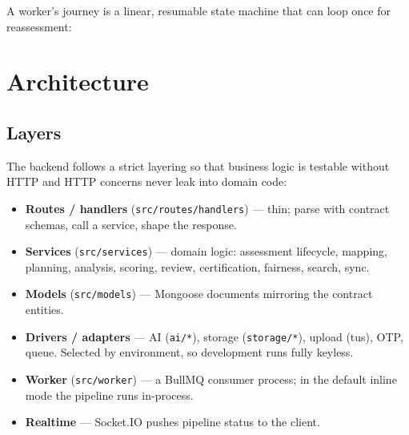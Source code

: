 \documentclass[11pt,a4paper]{article}
\newcommand{\code}[1]{\texttt{\small #1}}
\begin{document}
\noindent A worker's journey is a linear, resumable state machine that can
loop once for reassessment:

\begin{center}
\end{center}

\section{Architecture}
\subsection{Layers}
The backend follows a strict layering so that business logic is testable
without HTTP and HTTP concerns never leak into domain code:
\begin{itemize}
\item \textbf{Routes / handlers} (\code{src/routes/handlers}) --- thin; parse
      with contract schemas, call a service, shape the response.
\item \textbf{Services} (\code{src/services}) --- domain logic: assessment
      lifecycle, mapping, planning, analysis, scoring, review, certification,
      fairness, search, sync.
\item \textbf{Models} (\code{src/models}) --- Mongoose documents mirroring
      the contract entities.
\item \textbf{Drivers / adapters} --- AI (\code{ai/*}), storage
      (\code{storage/*}), upload (tus), OTP, queue. Selected by environment,
      so development runs fully keyless.
\item \textbf{Worker} (\code{src/worker}) --- a BullMQ consumer process; in
      the default inline mode the pipeline runs in-process.
\item \textbf{Realtime} --- Socket.IO pushes pipeline status to the client.
\end{itemize}
\end{document}
